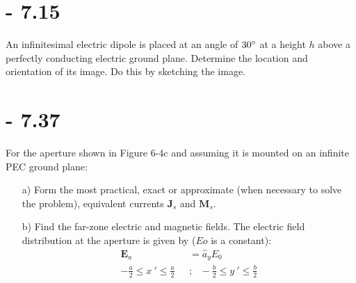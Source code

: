 \documentclass[12pt]{article}
\begin{document}
\section{- 7.15}
An infinitesimal electric dipole is placed at an angle of $30\degree$ at a height $h$ above a perfectly conducting electric ground plane. Determine the location and orientation of its image. Do this by sketching the image.
\begin{center}

\end{center}
\section{- 7.37}
For the aperture shown in Figure 6-4c and
assuming it is mounted on an infinite PEC
ground plane:
\begin{itemize}
\item [a)] Form the most practical, exact or approximate (when necessary to solve the problem), equivalent currents $\mathbf{J}_s$ and $\mathbf{M}_s$.
\item [b)] Find the far-zone electric and magnetic fields. The electric field distribution at the aperture is given by ($Eo$ is a constant):\\
  \begin{align*}
    \mathbf{E}_a &= \hat a_yE_0\\
    -\frac{a}{2} \le x\ ' \le \frac{a}{2}\ \ \ &;\ \ \ -\frac{b}{2} \le y\ ' \le \frac{b}{2}
  \end{align*}
\end{itemize}


\end{document}
